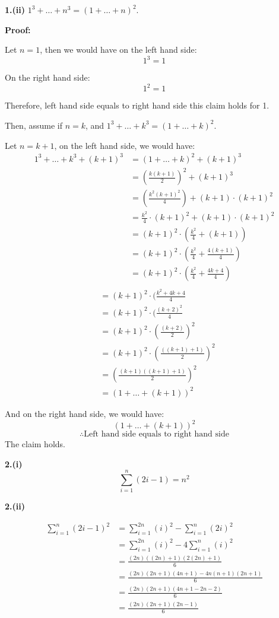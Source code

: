 \documentclass[a4paper,12pt]{report}
\begin{document}
\noindent
\textbf{1.(ii)} $1^3+\dots+n^3=(1+\dots+n)^2$.

\noindent
\textbf{Proof: }

\noindent
Let $n=1$, then we would have on the left hand side:
\[1^3=1\]

\noindent
On the right hand side:
\[1^2=1\]

\noindent
Therefore, left hand side equals to right hand side this claim holds for 1.

\noindent
Then, assume if $n=k$, and $1^3+\dots+k^3=(1+\dots+k)^2$.

\noindent
Let $n=k+1$, on the left hand side, we would have:
\begin{align*}
1^3+\dots+k^3+(k+1)^3
&=(1+\dots+k)^2+(k+1)^3\\
&=(\frac{k(k+1)}{2})^2+(k+1)^3\\
&=(\frac{k^2(k+1)^2}{4})+(k+1)\cdot{(k+1)^2}\\
&=\frac{k^2}{4}\cdot{(k+1)^2}+(k+1)\cdot{(k+1)^2}\\
&=(k+1)^2\cdot{(\frac{k^2}{4}+(k+1))}\\
&=(k+1)^2\cdot{(\frac{k^2}{4}+\frac{4(k+1)}{4})}\\
&=(k+1)^2\cdot{(\frac{k^2}{4}+\frac{4k+4}{4})}\\
\end{align*}
\begin{align*}
&=(k+1)^2\cdot{(\frac{k^2+4k+4}{4}}\\
&=(k+1)^2\cdot{(\frac{(k+2)^2}{4}}\\
&=(k+1)^2\cdot{(\frac{(k+2)}{2})^2}\\
&=(k+1)^2\cdot{(\frac{((k+1)+1)}{2})^2}\\
&=(\frac{(k+1)((k+1)+1)}{2})^2\\
&=(1+\dots+(k+1))^2
\end{align*}

\noindent
And on the right hand side, we would have:
\[(1+\dots+(k+1))^2\]
\[\therefore \text{Left hand side equals to right hand side}\]
The claim holds. 

\noindent
\textbf{2.(i)}$$\sum_{i=1}^{n} (2i-1)=n^2$$

\noindent
\textbf{2.(ii)}

\begin{align*}
\sum_{i=1}^{n} (2i-1)^2
&=\sum_{i=1}^{2n} (i)^2-\sum_{i=1}^{n} (2i)^2\\
&=\sum_{i=1}^{2n} (i)^2-4\sum_{i=1}^{n} (i)^2\\
&=\frac{(2n)((2n)+1)(2(2n)+1)}{6}\\
&=\frac{(2n)(2n+1)(4n+1)-4n(n+1)(2n+1)}{6}\\
&=\frac{(2n)(2n+1)(4n+1-2n-2)}{6}\\
&=\frac{(2n)(2n+1)(2n-1)}{6}
\end{align*}
\end{document}
